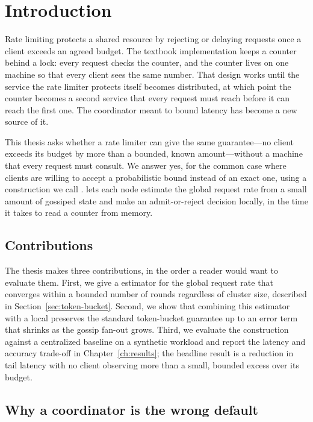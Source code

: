 \chapter{Introduction}
\label{ch:introduction}

Rate limiting protects a shared resource by rejecting or delaying requests once a client
exceeds an agreed budget. The textbook implementation keeps a counter behind a lock: every
request checks the counter, and the counter lives on one machine so that every client sees
the same number. That design works until the service the rate limiter protects itself
becomes distributed, at which point the counter becomes a second service that every request
must reach before it can reach the first one. The coordinator meant to bound latency has
become a new source of it.

This thesis asks whether a rate limiter can give the same guarantee---no client exceeds its
budget by more than a bounded, known amount---without a machine that every request must
consult. We answer yes, for the common case where clients are willing to accept a
probabilistic bound instead of an exact one, using a construction we call \sysname{}.
\sysname{} lets each node estimate the global request rate from a small amount of gossiped
state and make an admit-or-reject decision locally, in the time it takes to read a counter
from memory.

\section{Contributions}
\label{sec:intro-contributions}

The thesis makes three contributions, in the order a reader would want to evaluate them.
First, we give a  estimator for the global request rate that converges
within a bounded number of rounds regardless of cluster size, described in
Section~\ref{sec:token-bucket}. Second, we show that combining this estimator with a local
 preserves the standard token-bucket guarantee up to an error term that
shrinks as the gossip fan-out grows. Third, we evaluate the construction against a
centralized baseline on a synthetic workload and report the latency and accuracy trade-off
in Chapter~\ref{ch:results}; the headline result is a reduction in tail latency with no
client observing more than a small, bounded excess over its budget.

\section{Why a coordinator is the wrong default}

